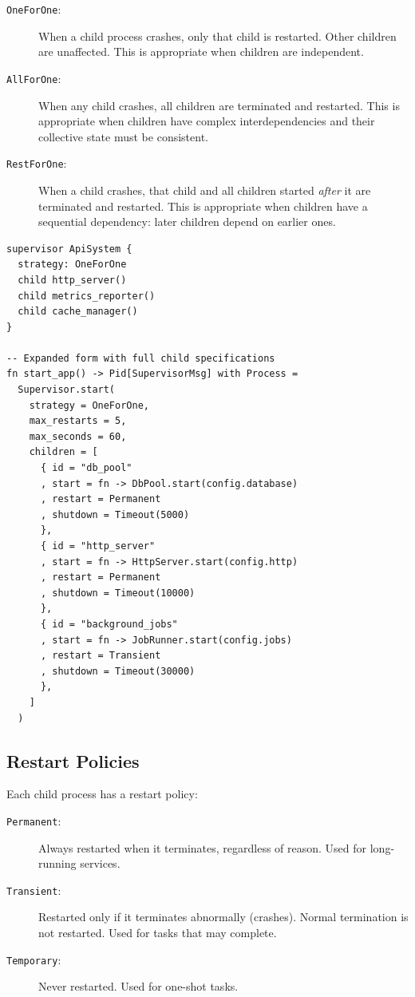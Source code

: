 \documentclass[11pt,a4paper]{article}
\begin{document}
\begin{description}
\item[\texttt{OneForOne}:] When a child process crashes, only that child is restarted. Other children are unaffected. This is appropriate when children are independent.

\item[\texttt{AllForOne}:] When any child crashes, all children are terminated and restarted. This is appropriate when children have complex interdependencies and their collective state must be consistent.

\item[\texttt{RestForOne}:] When a child crashes, that child and all children started \emph{after} it are terminated and restarted. This is appropriate when children have a sequential dependency: later children depend on earlier ones.
\end{description}

\begin{lstlisting}[language=japl,caption={Supervisor declaration with typed crash reasons}]
supervisor ApiSystem {
  strategy: OneForOne
  child http_server()
  child metrics_reporter()
  child cache_manager()
}

-- Expanded form with full child specifications
fn start_app() -> Pid[SupervisorMsg] with Process =
  Supervisor.start(
    strategy = OneForOne,
    max_restarts = 5,
    max_seconds = 60,
    children = [
      { id = "db_pool"
      , start = fn -> DbPool.start(config.database)
      , restart = Permanent
      , shutdown = Timeout(5000)
      },
      { id = "http_server"
      , start = fn -> HttpServer.start(config.http)
      , restart = Permanent
      , shutdown = Timeout(10000)
      },
      { id = "background_jobs"
      , start = fn -> JobRunner.start(config.jobs)
      , restart = Transient
      , shutdown = Timeout(30000)
      },
    ]
  )
\end{lstlisting}

\subsection{Restart Policies}

Each child process has a restart policy:

\begin{description}
\item[\texttt{Permanent}:] Always restarted when it terminates, regardless of reason. Used for long-running services.
\item[\texttt{Transient}:] Restarted only if it terminates abnormally (crashes). Normal termination is not restarted. Used for tasks that may complete.
\item[\texttt{Temporary}:] Never restarted. Used for one-shot tasks.
\end{description}
\end{document}
